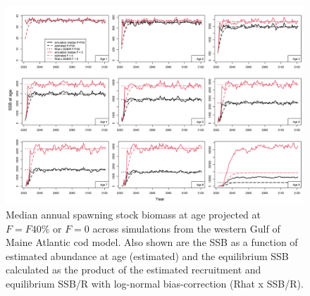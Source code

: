 \documentclass[
]{article}
\begin{document}
\begin{landscape}
\begin{figure}

{\centering \includegraphics[width=1\linewidth]{compare_SSBAA_F40_at_age} 

}

\caption{Median annual spawning stock biomass at age projected at $F = F40\%$ or $F=0$ across simulations from the western Gulf of Maine Atlantic cod model. Also shown are the SSB as a function of estimated abundance at age (estimated) and the equilibrium SSB calculated as the product of the estimated recruitment and equilibrium SSB/R with log-normal bias-correction (Rhat x SSB/R).}\label{fig:ssbaa}
\end{figure}
\end{landscape}
\end{document}

